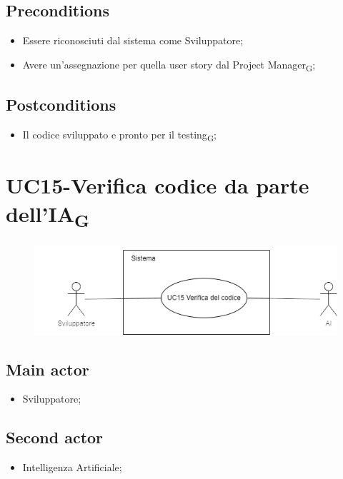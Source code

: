 \documentclass{article}
\begin{document}
    \subsection*{Preconditions}
        \begin{itemize}
            \item Essere riconosciuti dal sistema come Sviluppatore;
            \item Avere un'assegnazione per quella user story dal Project Manager\textsubscript{G};
        \end{itemize}
        
    \subsection*{Postconditions} 
        \begin{itemize}
            \item Il codice sviluppato e pronto per il testing\textsubscript{G};
        \end{itemize}
        
\section{UC15-Verifica codice da parte dell'IA\textsubscript{G}}
    \begin{figure}[h]
      \centering
      \includegraphics{./imgUML/UC15.png}
      \label{fig:immagine}
    \end{figure}
    
    \subsection*{Main actor}
        \begin{itemize}
            \item Sviluppatore;
        \end{itemize}
    \subsection*{Second actor}
        \begin{itemize}
            \item Intelligenza Artificiale;
        \end{itemize}
    
\end{document}
